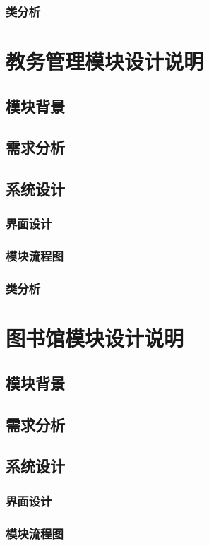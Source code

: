\documentclass{article}
\begin{document}
\subsubsection{类分析}

\section{教务管理模块设计说明}
\subsection{模块背景}
\subsection{需求分析}
\subsection{系统设计}
\subsubsection{界面设计}
\subsubsection{模块流程图}
\subsubsection{类分析}

\section{图书馆模块设计说明}
\subsection{模块背景}
\subsection{需求分析}
\subsection{系统设计}
\subsubsection{界面设计}
\subsubsection{模块流程图}
\end{document}
